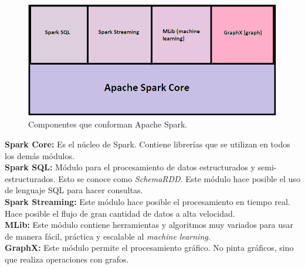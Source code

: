 \begin{figure}[H]
	\hypertarget{fig:sparkComponentes}{\hspace{1pt}}
	\begin{center}
		\includegraphics{capitulo2/images/sparkComponentes.png}
		\caption{Componentes que conforman Apache Spark.}
		\label{fig:sparkComponentes}
	\end{center}
\end{figure}

\begin{UClist}
	\UCli \textbf{Spark Core:} Es el núcleo de Spark. Contiene librerías que se utilizan en todos los demás módulos.\\

	\UCli \textbf{Spark SQL:} Módulo para el procesamiento de datos estructurados y semi-estructurados. Esto se conoce como \emph{SchemaRDD}. Este módulo hace posible el uso de lenguaje SQL para hacer consultas.\\

	\UCli \textbf{Spark Streaming:} Este módulo hace posible el procesamiento en tiempo real. Hace posible el flujo de gran cantidad de datos a alta velocidad.\\

	\UCli \textbf{MLib:} Este módulo contiene herramientas y algoritmos muy variados para usar de manera fácil, práctica y escalable al \emph{machine learning}.\\

	\UCli \textbf{GraphX:} Este módulo permite el procesamiento gráfico. No pinta gráficos, sino que realiza operaciones con grafos.\\

\end{UClist}